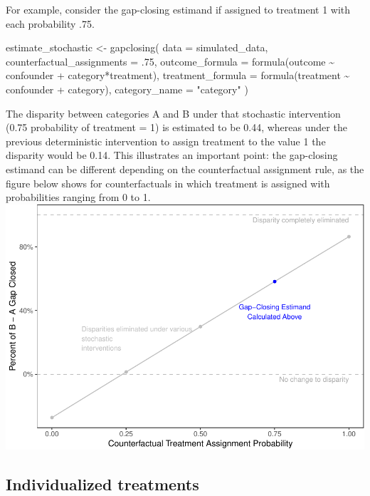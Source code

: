 \documentclass[
]{article}
\newenvironment{Shaded}{\begin{snugshade}}{\end{snugshade}}
\newcommand{\AttributeTok}[1]{\textcolor[rgb]{0.77,0.63,0.00}{#1}}
\newcommand{\DecValTok}[1]{\textcolor[rgb]{0.00,0.00,0.81}{#1}}
\newcommand{\FunctionTok}[1]{\textcolor[rgb]{0.00,0.00,0.00}{#1}}
\newcommand{\NormalTok}[1]{#1}
\newcommand{\OtherTok}[1]{\textcolor[rgb]{0.56,0.35,0.01}{#1}}
\newcommand{\SpecialCharTok}[1]{\textcolor[rgb]{0.00,0.00,0.00}{#1}}
\newcommand{\StringTok}[1]{\textcolor[rgb]{0.31,0.60,0.02}{#1}}
\begin{document}
For example, consider the gap-closing estimand if assigned to treatment 1 with each probability .75.

\begin{Shaded}
\begin{Highlighting}[]
\NormalTok{estimate\_stochastic }\OtherTok{\textless{}{-}} \FunctionTok{gapclosing}\NormalTok{(}
  \AttributeTok{data =}\NormalTok{ simulated\_data,}
  \AttributeTok{counterfactual\_assignments =}\NormalTok{ .}\DecValTok{75}\NormalTok{,}
  \AttributeTok{outcome\_formula =} \FunctionTok{formula}\NormalTok{(outcome }\SpecialCharTok{\textasciitilde{}}\NormalTok{ confounder }\SpecialCharTok{+}\NormalTok{ category}\SpecialCharTok{*}\NormalTok{treatment),}
  \AttributeTok{treatment\_formula =} \FunctionTok{formula}\NormalTok{(treatment }\SpecialCharTok{\textasciitilde{}}\NormalTok{ confounder }\SpecialCharTok{+}\NormalTok{ category),}
  \AttributeTok{category\_name =} \StringTok{"category"}
\NormalTok{)}
\end{Highlighting}
\end{Shaded}

The disparity between categories A and B under that stochastic intervention (0.75 probability of treatment = 1) is estimated to be 0.44, whereas under the previous deterministic intervention to assign treatment to the value 1 the disparity would be 0.14. This illustrates an important point: the gap-closing estimand can be different depending on the counterfactual assignment rule, as the figure below shows for counterfactuals in which treatment is assigned with probabilities ranging from 0 to 1.
\includegraphics{github_doc_files/figure-latex/unnamed-chunk-26-1.pdf}

\hypertarget{individualized-treatments}{%
\subsection{Individualized treatments}\label{individualized-treatments}}
\end{document}

